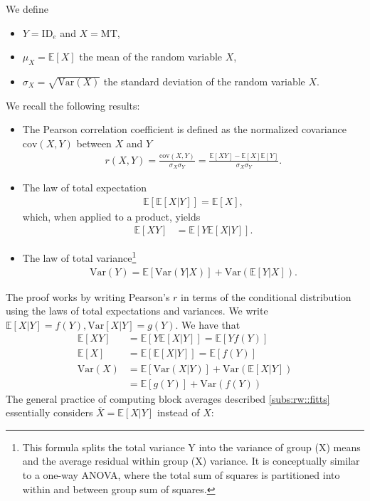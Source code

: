 \documentclass[acmlarge, manuscript,review]{acmart}
\newcommand{\mt}{\ensuremath{{\text{MT}}}\xspace}
\newcommand{\ide}{\ensuremath{{\text{ID}_e}}\xspace}
\begin{document}
We define
\begin{itemize}
	\item $Y=\ide$ and $X=\mt$,
	\item $\mu_X = \mathbb{E}[X]$ the mean of the random variable $X$,
	\item $\sigma_X = \sqrt{\text{Var}(X)}$ the standard deviation of the random variable $X$.
\end{itemize}
We recall the following results:
\begin{itemize}
	\item The Pearson correlation coefficient is defined as the normalized covariance $\text{cov}(X,Y)$ between $X$ and $Y$
	\begin{align}
		r(X,Y) = \frac{\text{cov}(X,Y)}{\sigma_X \sigma_Y} = \frac{\mathbb{E}[XY] - \mathbb{E}[X]\mathbb{E}[Y]}{\sigma_X \sigma_Y}. \label{eq:pearson_definition}
	\end{align}
	\item The law of total expectation
		\begin{align}
			\mathbb{E}[\mathbb{E}[X|Y]] = \mathbb{E}[X],
		\end{align}
		which, when applied to a product, yields
		\begin{align}
			\mathbb{E}[XY] & = \mathbb{E}[Y\mathbb{E}[X|Y]].
		\end{align}
	\item The law of total variance\footnote{This formula splits the total variance Y into the variance of group (X) means and the average residual within group (X) variance. It is conceptually similar to a one-way ANOVA, where the total sum of squares is partitioned into within and between group sum of squares.}
		\begin{align}
			\text{Var}(Y) = \mathbb{E}[\text{Var}(Y|X)] + \text{Var}(\mathbb{E}[Y|X]).
		\end{align}
\end{itemize}
The proof works by writing Pearson's $r$ in terms of the conditional distribution using the laws of total expectations and variances.
We write $\mathbb{E}[X|Y] = f(Y), \text{Var}[X|Y] = g(Y)$. We have that
\begin{align}
	\mathbb{E}[XY] & = \mathbb{E}[Y\mathbb{E}[X|Y]]   =      \mathbb{E}[Yf(Y)]   \label{eq:proof_1}                   \\
	\mathbb{E}[X]  & = \mathbb{E}[\mathbb{E}[X|Y]] = \mathbb{E}[f(Y)]           \label{eq:proof_2}                    \\
	\text{Var}(X)  & = \mathbb{E}[\text{Var}(X|Y)] + \text{Var}(\mathbb{E}[X|Y])                   \label{eq:proof_3} \\
	               & = \mathbb{E}[g(Y)] + \text{Var}(f(Y))
\end{align}
The general practice of computing block averages described \autoref{subs:rw::fitts} essentially considers $\overline{X} = \mathbb{E}[X|Y]$ instead of $X$:
\end{document}

